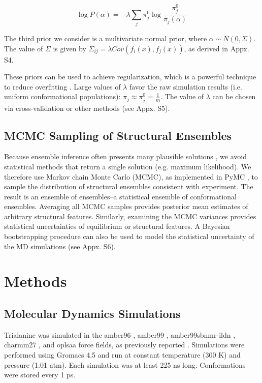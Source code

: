 \documentclass[11pt,titlepage]{article}
\begin{document}
$$\log P(\alpha) = -\lambda \sum_j \pi_j^0 \log \frac{\pi_j^0}{\pi_j(\alpha)}$$

The third prior we consider is a multivariate normal prior, where  $\alpha \sim N(0, \Sigma)$.  The value of $\Sigma$ is given by $\Sigma_{ij} = \lambda Cov(f_i(x), f_j(x))$, as derived in Appx. S4.

These priors can be used to achieve regularization, which is a powerful technique to reduce overfitting \cite{friedman2001elements}.  Large values of $\lambda$ favor the raw simulation results (i.e. uniform conformational populations): $\pi_j \approx \pi_j^0 = \frac{1}{m}$.  The value of $\lambda$ can be chosen via cross-validation or other methods (see Appx. S5).  

\subsection*{MCMC Sampling of Structural Ensembles}

Because ensemble inference often presents many plausible solutions  \citep{fisher2010, rieping2005}, we avoid statistical methods that return a single solution (e.g. maximum likelihood).  We therefore use Markov chain Monte Carlo (MCMC), as implemented in PyMC  \citep{patil2010pymc}, to sample the distribution of structural ensembles consistent with experiment.  The result is an ensemble of ensembles--a statistical ensemble of conformational ensembles.  Averaging all MCMC samples provides posterior mean  estimates of arbitrary structural features.  Similarly, examining the MCMC variances provides statistical uncertainties of equilibrium or structural features.  A Bayesian bootstrapping procedure  \citep{rubin1981} can also be used to model the statistical uncertainty of the MD simulations (see Appx. S6).

\section*{Methods}

\subsection*{Molecular Dynamics Simulations}

Trialanine was simulated in the amber96 \citep{kollman1996}, amber99 \citep{wang2000}, amber99sbnmr-ildn \citep{li2010, Lindorff-Larsen2010}, charmm27 \citep{mackerell2004extending,bjelkmar2010implementation}, and oplsaa \citep{kaminski2001evaluation} force fields, as previously reported  \citep{beauchamp2012protein}.  Simulations were performed using Gromacs 4.5  \citep{hess2008} and run at constant temperature (300 K) and pressure (1.01 atm).  Each simulation was at least 225 ns long.  Conformations were stored every 1 ps.  
\end{document}

